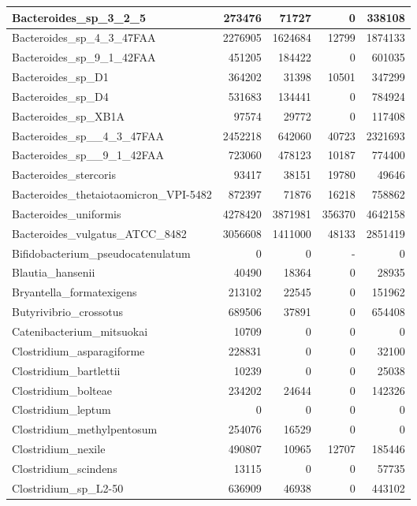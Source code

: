 \documentclass[12pt,a4paper]{article}
\begin{document}
\begin{table}[ht]
\begin{center}
\begin{tabular}{|l*{4}{|r}|}
Bacteroides\_sp\_3\_2\_5 & 273476 & 71727 & 0 & 338108 \\ \hline
Bacteroides\_sp\_4\_3\_47FAA & 2276905 & 1624684 & 12799 & 1874133 \\ \hline
Bacteroides\_sp\_9\_1\_42FAA & 451205 & 184422 & 0 & 601035 \\ \hline
Bacteroides\_sp\_D1 & 364202 & 31398 & 10501 & 347299 \\ \hline
Bacteroides\_sp\_D4 & 531683 & 134441 & 0 & 784924 \\ \hline
Bacteroides\_sp\_XB1A & 97574 & 29772 & 0 & 117408 \\ \hline
Bacteroides\_sp\_\_4\_3\_47FAA & 2452218 & 642060 & 40723 & 2321693 \\ \hline
Bacteroides\_sp\_\_9\_1\_42FAA & 723060 & 478123 & 10187 & 774400 \\ \hline
Bacteroides\_stercoris & 93417 & 38151 & 19780 & 49646 \\ \hline
Bacteroides\_thetaiotaomicron\_VPI-5482 & 872397 & 71876 & 16218 & 758862 \\ \hline
Bacteroides\_uniformis & 4278420 & 3871981 & 356370 & 4642158 \\ \hline
Bacteroides\_vulgatus\_ATCC\_8482 & 3056608 & 1411000 & 48133 & 2851419 \\ \hline
Bifidobacterium\_pseudocatenulatum & 0 & 0 & - & 0 \\ \hline
Blautia\_hansenii & 40490 & 18364 & 0 & 28935 \\ \hline
Bryantella\_formatexigens & 213102 & 22545 & 0 & 151962 \\ \hline
Butyrivibrio\_crossotus & 689506 & 37891 & 0 & 654408 \\ \hline
Catenibacterium\_mitsuokai & 10709 & 0 & 0 & 0 \\ \hline
Clostridium\_asparagiforme & 228831 & 0 & 0 & 32100 \\ \hline
Clostridium\_bartlettii & 10239 & 0 & 0 & 25038 \\ \hline
Clostridium\_bolteae & 234202 & 24644 & 0 & 142326 \\ \hline
Clostridium\_leptum & 0 & 0 & 0 & 0 \\ \hline
Clostridium\_methylpentosum & 254076 & 16529 & 0 & 0 \\ \hline
Clostridium\_nexile & 490807 & 10965 & 12707 & 185446 \\ \hline
Clostridium\_scindens & 13115 & 0 & 0 & 57735 \\ \hline
Clostridium\_sp\_L2-50 & 636909 & 46938 & 0 & 443102 \\ \hline

\end{tabular}
\end{center}
\end{table}
\end{document}
